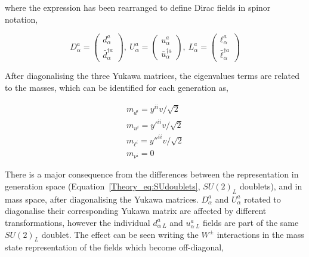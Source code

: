 where the expression has been rearranged to define Dirac fields in spinor notation,

\begin{equation}
\label{Theory_eq:Diracmassspace}
    D_\alpha^a = \begin{pmatrix} d_\alpha^a \\ \bar{d}^{\dag a}_\alpha \end{pmatrix},\ 
    U_\alpha^a = \begin{pmatrix} u_\alpha^a \\ \bar{u}^{\dag a}_\alpha \end{pmatrix},\ 
    L_\alpha^a = \begin{pmatrix} \ell_\alpha^a \\ \bar{\ell}^{\dag a}_\alpha \end{pmatrix}
\end{equation}

After diagonalising the three Yukawa matrices, the eigenvalues terms are related to the masses, which can be identified for each generation as,

\begin{equation}
\begin{split}
m_{d^i} = y^{ii}v/\sqrt{2} \\ 
m_{u^i} = y'^{ii}v/\sqrt{2} \\
m_{\ell^i} = y''^{ii}v/\sqrt{2} \\
m_{\nu^i} = 0
\end{split}
\end{equation}

There is a major consequence from the differences between the representation in generation space (Equation~\ref{Theory_eq:SUdoublets}, $SU(2)_L$ doublets), and in mass space, after diagonalising the Yukawa matrices. $D^a_{\alpha}$ and $U^a_{\alpha}$ rotated to diagonalise their corresponding Yukawa matrix are affected by different transformations, however the individual $d^a_{\alpha\ L}$ and $u^a_{\alpha\ L}$ fields are part of the same $SU(2)_L$ doublet. The effect can be seen writing the $W^\pm$ interactions in the mass state representation of the fields which become off-diagonal,

